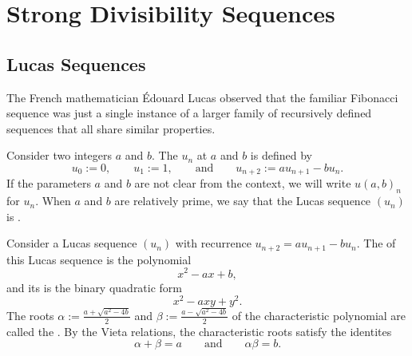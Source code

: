 \chapter{Strong Divisibility Sequences}

\section{Lucas Sequences}

The French mathematician \'Edouard Lucas observed that the familiar Fibonacci sequence was just a single instance of a larger family of recursively defined sequences that all share similar properties. 

\begin{definition}
  Consider two integers $a$ and $b$. The  $u_n$ at $a$ and $b$ is defined by
  \begin{equation*}
    u_0:= 0, \qquad u_1:=1,\qquad\text{and}\qquad u_{n+2}:= au_{n+1}- bu_n.
  \end{equation*}
  If the parameters $a$ and $b$ are not clear from the context, we will write $u(a,b)_n$ for $u_n$. When $a$ and $b$ are relatively prime, we say that the Lucas sequence $(u_n)$ is .

  Consider a Lucas sequence $(u_n)$ with recurrence $u_{n+2}=au_{n+1}-bu_n$. The  of this Lucas sequence is the polynomial
  \begin{equation*}
    x^2-ax+b,
  \end{equation*}
  and its  is the binary quadratic form
  \begin{equation*}
    x^2-axy+y^2.
  \end{equation*}
  The roots $\alpha:=\frac{a+\sqrt{a^2-4b}}{2}$ and $\beta:=\frac{a-\sqrt{a^2-4b}}{2}$ of the characteristic polynomial are called the . By the Vieta relations, the characteristic roots satisfy the identites
  \begin{equation*}
    \alpha+\beta = a\qquad\text{and}\qquad \alpha\beta=b.
  \end{equation*}
\end{definition}

